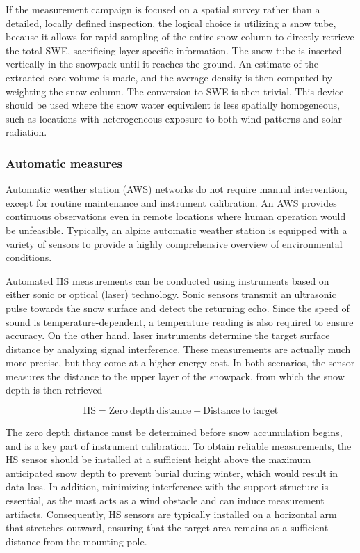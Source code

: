 If the measurement campaign is focused on a spatial survey rather than a detailed, locally defined inspection, the logical choice is utilizing a 
snow tube, because it allows for rapid sampling of the entire snow column to directly retrieve the total SWE, sacrificing layer-specific information.
The snow tube is inserted vertically in the snowpack until it reaches the ground. An estimate of the extracted core volume is made, and the average 
density is then computed by weighting the snow column. The conversion to SWE is then trivial. This device should be used where the snow water 
equivalent is less spatially homogeneous, such as locations with heterogeneous exposure to both wind patterns and solar radiation.



\subsubsection{Automatic measures}

Automatic weather station (AWS) networks do not require manual intervention, except for routine maintenance and instrument calibration. An AWS 
provides continuous observations even in remote locations where human operation would be unfeasible. Typically, an alpine automatic weather station 
is equipped with a variety of sensors to provide a highly comprehensive overview of environmental conditions. 

Automated HS measurements can be conducted using instruments based on either sonic or optical (laser) technology. Sonic sensors transmit an 
ultrasonic pulse towards the snow surface and detect the returning echo. Since the speed of sound is temperature-dependent, a temperature reading 
is also required to ensure accuracy. On the other hand, laser instruments determine the target surface distance by analyzing signal interference. 
These measurements are actually much more precise, but they come at a higher energy cost. In both scenarios, the sensor measures the distance to 
the upper layer of the snowpack, from which the snow depth is then retrieved 

\begin{equation}
    \mathrm{HS} = \mathrm{Zero\ depth\ distance} - \mathrm{Distance\ to\ target}
    \label{eq:auto_HS}
\end{equation}

The zero depth distance must be determined before snow accumulation begins, and is a key part of instrument calibration. To obtain reliable 
measurements, the HS sensor should be installed at a sufficient height above the maximum anticipated snow depth to prevent burial during winter, 
which would result in data loss. In addition, minimizing interference with the support structure is essential, as the mast acts as a wind obstacle 
and can induce measurement artifacts. Consequently, HS sensors are typically installed on a horizontal arm that stretches outward, ensuring that 
the target area remains at a sufficient distance from the mounting pole.

